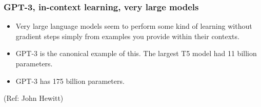 \begin{frame}[fragile]\frametitle{GPT-3, in-context learning, very large models}


      \begin{itemize}
			\item Very large language models seem to perform some kind of learning without gradient  steps simply from examples you provide within their contexts.
			\item GPT-3 is the canonical example of this. The largest T5 model had 11 billion parameters.
			\item GPT-3 has 175 billion parameters.

			\end{itemize}

			{\tiny (Ref: John Hewitt)}

\end{frame}





